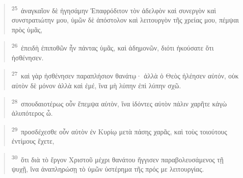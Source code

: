 \documentclass{article}
\newcommand{\currentverse}{1} %
\newcommand{\setcurrentverse}[1]{\renewcommand{\currentverse}{#1}}
\begin{document}
\begin{verse}

\setcurrentverse{25}

\setcounter{footnote}{0}

\textsuperscript{25}~ἀναγκαῖον δὲ ἡγησάμην Ἐπαφρόδιτον τὸν ἀδελφὸν καὶ συνεργὸν καὶ συνστρατιώτην μου, ὑμῶν δὲ ἀπόστολον καὶ λειτουργὸν τῆς χρείας μου, πέμψαι πρὸς ὑμᾶς,

\end{verse}

\begin{verse}

\setcurrentverse{26}

\setcounter{footnote}{0}

\textsuperscript{26}~ἐπειδὴ ἐπιποθῶν ἦν πάντας ὑμᾶς, καὶ ἀδημονῶν, διότι ἠκούσατε ὅτι ἠσθένησεν.

\end{verse}

\begin{verse}

\setcurrentverse{27}

\setcounter{footnote}{0}

\textsuperscript{27}~καὶ γὰρ ἠσθένησεν παραπλήσιον θανάτῳ· ἀλλὰ ὁ Θεὸς ἠλέησεν αὐτόν, οὐκ αὐτὸν δὲ μόνον ἀλλὰ καὶ ἐμέ, ἵνα μὴ λύπην ἐπὶ λύπην σχῶ.

\end{verse}

\begin{verse}

\setcurrentverse{28}

\setcounter{footnote}{0}

\textsuperscript{28}~σπουδαιοτέρως οὖν ἔπεμψα αὐτὸν, ἵνα ἰδόντες αὐτὸν πάλιν χαρῆτε κἀγὼ ἀλυπότερος ὦ.

\end{verse}

\begin{verse}

\setcurrentverse{29}

\setcounter{footnote}{0}

\textsuperscript{29}~προσδέχεσθε οὖν αὐτὸν ἐν Κυρίῳ μετὰ πάσης χαρᾶς, καὶ τοὺς τοιούτους ἐντίμους ἔχετε,

\end{verse}

\begin{verse}

\setcurrentverse{30}

\setcounter{footnote}{0}

\textsuperscript{30}~ὅτι διὰ τὸ ἔργον Χριστοῦ μέχρι θανάτου ἤγγισεν παραβολευσάμενος τῇ ψυχῇ, ἵνα ἀναπληρώσῃ τὸ ὑμῶν ὑστέρημα τῆς πρός με λειτουργίας.

\end{verse}
\end{document}
